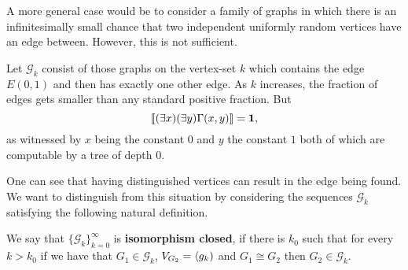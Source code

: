A more general case would be to consider a family of graphs in which there is an infinitesimally small chance that two independent uniformly random vertices have an edge between. However, this is not sufficient.

\begin{exam}
Let $\mathcal{G}_k$ consist of those graphs on the vertex-set $k$ which contains the edge $E(0,1)$ and then has exactly one other edge. As $k$ increases, the fraction of edges gets smaller than any standard positive fraction. But
\[\llbracket(\exists x)(\exists y)\Gamma(x,y)\rrbracket=\textbf{1},\]
as witnessed by $x$ being the constant $0$ and $y$ the constant $1$ both of which are computable by a tree of depth $0$.
\end{exam}

One can see that having distinguished vertices can result in the edge being found. We want to distinguish from this situation by considering the sequences $\mathcal{G}_k$ satisfying the following natural definition.

\begin{defi}
We say that $\{\mathcal{G}_k\}_{k=0}^\infty$ is \textbf{isomorphism closed}, if there is $k_0$ such that for every $k>k_0$ if we have that $G_1\in\mathcal{G}_k$, $V_{G_2}=\langle g_k)$ and $G_1\cong G_2$ then $G_2\in\mathcal{G}_k$.
\end{defi}


